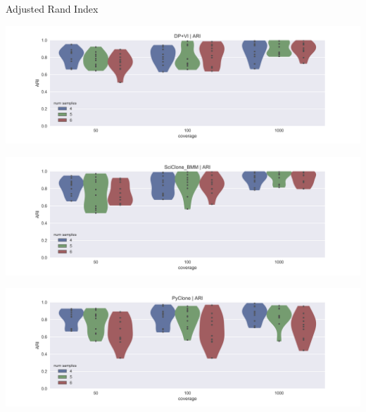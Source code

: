 \documentclass{beamer}
\begin{document}
\begin{frame}{Adjusted Rand Index}
\vspace{-0.05in}
\centerline{\includegraphics[scale=0.27]{images/DPVI_ARI.png}}
\vspace{-0.05in}
\centerline{\includegraphics[scale=0.27]{images/SciClone_ARI.png}}
\vspace{-0.05in}
\centerline{\includegraphics[scale=0.27]{images/PyClone_ARI.png}}
\end{frame}
\end{document}
